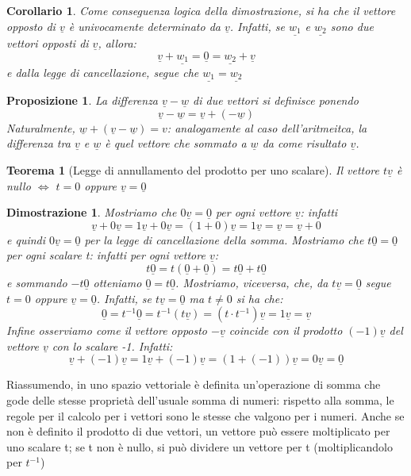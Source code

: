 \documentclass[12pt]{article}
\newenvironment{para}{\begin{adjustwidth}{13mm}{}}{\end{adjustwidth}}
\newtheorem{Corollario}{Corollario}[subsection]
\newtheorem{Teorema}{Teorema}[subsection]
\newtheorem{Proposizione}{Proposizione}[subsection]
\newtheorem{Dimostrazione}{Dimostrazione}[subsection]
\begin{document}
\begin{para}
\begin{Corollario}
Come conseguenza logica della dimostrazione, si ha che il vettore opposto di $\underline{v}$ è univocamente determinato da $\underline{v}$. Infatti, se $\underline{w_1}$ e $\underline{w_2}$ sono due vettori opposti di $\underline{v}$, allora: $$\underline{v}+\underline{w_1} = \underline{0} = \underline{w_2} + \underline{v}$$ e dalla legge di cancellazione, segue che $\underline{w_1} = \underline{w_2}$
\end{Corollario}

\begin{Proposizione}
La differenza $\underline{v}-\underline{w}$ di due vettori si definisce ponendo $$\underline{v}-\underline{w} = \underline{v} + (-\underline{w})$$
Naturalmente, $\underline{w} + (\underline{v}-\underline{w}) = v$: analogamente al caso dell'aritmeitca, la differenza tra $\underline{v}$ e $\underline{w}$ è quel vettore che sommato a $\underline{w}$ da come risultato $\underline{v}$.
\end{Proposizione}

\begin{Teorema} [Legge di annullamento del prodotto per uno scalare]
Il vettore $t\underline{v}$ è nullo $\Leftrightarrow$ $t = 0$ oppure $\underline{v} = \underline{0}$
\end{Teorema}
\begin{Dimostrazione}
Mostriamo che $0\underline{v} = \underline{0}$ per ogni vettore $\underline{v}$: infatti $$\underline{v} + 0\underline{v}=1\underline{v}+0\underline{v}=(1+0)\underline{v}=1\underline{v}=\underline{v}=\underline{v}+0$$
e quindi $0\underline{v}=\underline{0}$ per la legge di cancellazione della somma. \newline
Mostriamo che $t\underline{0} = \underline{0}$ per ogni scalare t: infatti per ogni vettore $\underline{v}$: $$t\underline{0}=t(\underline{0}+\underline{0}) = t\underline{0}+t\underline{0}$$ e sommando $-t\underline{0}$ otteniamo $\underline{0} = t\underline{0}$.
\newline Mostriamo, viceversa, che, da $t\underline{v} =  \underline{0}$ segue $t = 0$ oppure $\underline{v} = \underline{0}$. Infatti, se $t\underline{v}=\underline{0}$ ma $t \neq 0$ si ha che: $$\underline{0} = t^{-1}\underline{0} = t^{-1}(t\underline{v})=(t \cdot t^{-1})\underline{v} = 1\underline{v} = \underline{v}$$ Infine osserviamo come il vettore opposto $-\underline{v}$ coincide con il prodotto $(-1)\underline{v}$ del vettore $\underline{v}$ con lo scalare -1. Infatti:
$$\underline{v} + (-1)\underline{v} = 1\underline{v} + (-1)\underline{v} = (1 + (-1))\underline{v} = 0\underline{v} = \underline{0}$$
\end{Dimostrazione}
Riassumendo, in uno spazio vettoriale è definita un'operazione di somma che gode delle stesse proprietà dell'usuale somma di numeri: rispetto alla somma, le regole per il calcolo per i vettori sono le stesse che valgono per i numeri. Anche se non è definito il prodotto di due vettori, un vettore può essere moltiplicato per uno scalare t; se t non è nullo, si può dividere un vettore per t (moltiplicandolo per $t^{-1}$)
\newpage

\end{para}
\end{document}
